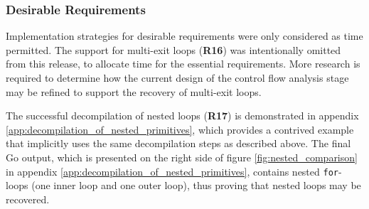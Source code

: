 
\subsubsection{Desirable Requirements}
\label{sec:eval_control_flow_analysis_library_desirable_requirements}


Implementation strategies for desirable requirements were only considered as time permitted. The support for multi-exit loops (\textbf{R16}) was intentionally omitted from this release, to allocate time for the essential requirements. More research is required to determine how the current design of the control flow analysis stage may be refined to support the recovery of multi-exit loops.


The successful decompilation of nested loops (\textbf{R17}) is demonstrated in appendix \ref{app:decompilation_of_nested_primitives}, which provides a contrived example that implicitly uses the same decompilation steps as described above. The final Go output, which is presented on the right side of figure \ref{fig:nested_comparison} in appendix \ref{app:decompilation_of_nested_primitives}, contains nested \texttt{for}-loops (one inner loop and one outer loop), thus proving that nested loops may be recovered.
